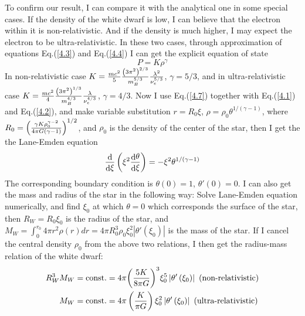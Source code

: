 \documentclass[reprint]{revtex4-1}
\begin{document}
To confirm our result, I can compare it with the analytical one in some special cases. If the density of the white dwarf is low, I can believe that the electron within it is non-relativistic. And if the density is much higher, I may expect the electron to be ultra-relativistic. In these two cases, through approximation of equations Eq.(\ref{4.3}) and Eq.(\ref{4.4})  I can get the explicit equation of state
\begin{equation}
P = K{\rho ^\gamma } \label{4.7}
\end{equation}
In non-relativistic case $K = {{m{c^2}} \over 5}{{{{\left( {3{\pi ^2}} \right)}^{2/3}}} \over {m_B^{5/3}}}{{{\lambda ^2}} \over {\nu _e^{5/3}}}$, $\gamma  = 5/3$, and in ultra-relativistic case $K = {{m{c^2}} \over 4}{{{{\left( {3{\pi ^2}} \right)}^{1/3}}} \over {m_B^{4/3}}}{\lambda  \over {\nu _e^{4/3}}}$, $\gamma  = 4/3$. Now I use Eq.(\ref{4.7}) together with Eq.(\ref{4.1}) and Eq.(\ref{4.2}), and make variable substitution $r = {R_0}\xi $, $\rho  = {\rho _0}{\theta ^{1/\left( {\gamma  - 1} \right)}}$, where ${R_0} = {\left( {{{\gamma K\rho _0^{\gamma  - 2}} \over {4\pi G(\gamma  - 1)}}} \right)^{1/2}}$, and ${\rho _0}$ is the density of the center of the star, then I get the the Lane-Emden equation
\begin{equation}
{{\mathop{\rm d}\nolimits}  \over {{\mathop{\rm d}\nolimits} \xi }}\left( {{\xi ^2}{{{\mathop{\rm d}\nolimits} \theta } \over {{\mathop{\rm d}\nolimits} \xi }}} \right) =  - {\xi ^2}{\theta ^{1/\left( {\gamma  - 1} \right)}} \label{4.8}
\end{equation}
The corresponding boundary condition is $\theta \left( 0 \right) = 1$, $\theta '\left( 0 \right) = 0$. I can also get the mass and radius of the star in the following way: Solve Lane-Emden equation numerically, and find ${\xi _0}$ at which $\theta  = 0$ which corresponds the surface of the star, then ${R_W} = {R_0}{\xi _0}$  is the radius of the star, and ${M_W} = \int_0^{{r_0}} {4\pi {r^2}\rho \left( r \right)} dr = 4\pi R_0^3{\rho _0}\xi _0^2\left| {\theta '\left( {{\xi _0}} \right)} \right|$ is the mass of the star. If I cancel the central density ${\rho _0}$ from the above two relations, I then get the radius-mass relation of the white dwarf: 
\begin{align}
R_W^3{M_W} &= {\mathop{\rm const}\nolimits} . = 4\pi {\left( {{{5K} \over {8\pi G}}} \right)^3}\xi _0^5\left| {\theta '\left( {{\xi _0}} \right)} \right| \text{   (non-relativistic)} \nonumber \\
{M_W} &= {\mathop{\rm const}\nolimits} . = 4\pi \left( {{K \over {\pi G}}} \right)\xi _0^2\left| {\theta '\left( {{\xi _0}} \right)} \right| \text{   (ultra-relativistic)} \label{4.9}
\end{align}
\end{document}
